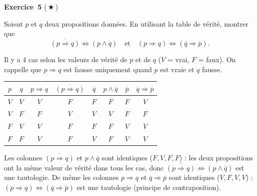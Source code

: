 \documentclass[11pt,a4paper]{article}
\begin{document}
	\medskip\noindent\textbf{\Large\color{bleu}Exercice~5} \textnormal{(\,$\bigstar$\,)}\nopagebreak
	\begin{enonce}
		Soient $p$ et $q$ deux propositions données. En utilisant la table de vérité, montrer que
		\[
		\overline{(p \Rightarrow q)} \Leftrightarrow (p \wedge \overline{q}) \quad \text{et} \quad (p \Rightarrow q) \Leftrightarrow (\overline{q} \Rightarrow \overline{p}).
		\]
	\end{enonce}
	\begin{corrige}
		Il y a $4$ cas selon les valeurs de vérité de $p$ et de $q$ ($V$ = vrai, $F$ = faux). On rappelle que $p\Rightarrow q$ est fausse uniquement quand $p$ est vraie et $q$ fausse.
		\begin{center}
			\begin{tabular}{cc|c|c|c|c|c|c}
				\toprule
				$p$ & $q$ & $p\Rightarrow q$ & $\overline{(p\Rightarrow q)}$ & $\overline q$ & $p\wedge\overline q$ & $\overline p$ & $\overline q\Rightarrow\overline p$\\
				\midrule
				$V$&$V$&$V$&$F$&$F$&$F$&$F$&$V$\\
				$V$&$F$&$F$&$V$&$V$&$V$&$F$&$F$\\
				$F$&$V$&$V$&$F$&$F$&$F$&$V$&$V$\\
				$F$&$F$&$V$&$F$&$V$&$F$&$V$&$V$\\
				\bottomrule
			\end{tabular}
		\end{center}
		Les colonnes $\overline{(p\Rightarrow q)}$ et $p\wedge\overline q$ sont identiques ($F,V,F,F$) : les deux propositions ont la même valeur de vérité dans tous les cas, donc $\overline{(p\Rightarrow q)}\Leftrightarrow(p\wedge\overline q)$ est une tautologie. De même les colonnes $p\Rightarrow q$ et $\overline q\Rightarrow\overline p$ sont identiques ($V,F,V,V$) : $(p\Rightarrow q)\Leftrightarrow(\overline q\Rightarrow\overline p)$ est une tautologie (principe de contraposition).
	\end{corrige}
	
\end{document}
